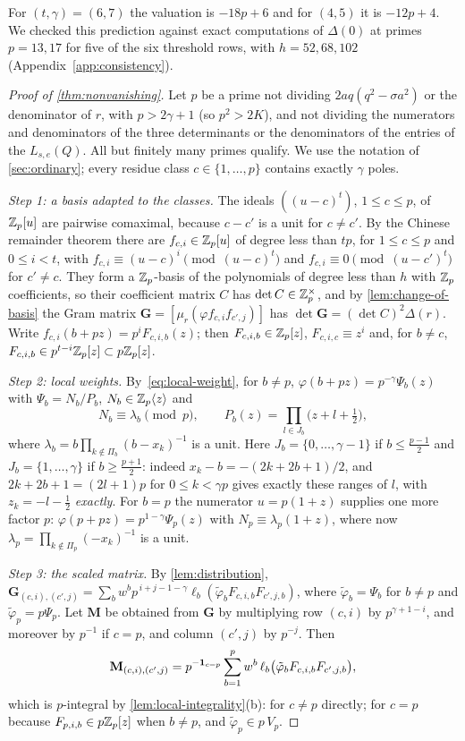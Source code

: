 For $(t,\gamma)=(6,7)$ the valuation is $-18p+6$ and for $(4,5)$ it is $-12p+4$. We checked this
prediction against exact computations of $\Delta(0)$ at primes $p=13,17$ for five of the six
threshold rows, with $h=52,68,102$ (Appendix~\ref{app:consistency}).

\begin{proof}[Proof of \cref{thm:nonvanishing}]
Let $p$ be a prime not dividing $2aq(q^2-\sigma a^2)$ or the denominator of $r$, with $p>2\gamma+1$
(so $p^2>2K$), and not dividing the numerators and denominators of the three determinants or the
denominators of the entries of the $L_{s,e}(Q)$. All but finitely many primes qualify. We use the
notation of \cref{sec:ordinary}; every residue class $c\in\{1,\dots,p\}$ contains exactly
$\gamma$ poles.

\emph{Step 1: a basis adapted to the classes.} The ideals $((u-c)^t)$, $1\le c\le p$, of
$\mathbb{Z}_p[u]$ are pairwise comaximal, because $c-c'$ is a unit for $c\ne c'$. By the Chinese remainder
theorem there are $f_{c,i}\in\mathbb{Z}_p[u]$ of degree less than $tp$, for $1\le c\le p$ and $0\le
i<t$, with $f_{c,i}\equiv(u-c)^i\pmod{(u-c)^t}$ and $f_{c,i}\equiv0\pmod{(u-c')^t}$ for $c'\ne c$.
They form a $\mathbb{Z}_p$-basis of the polynomials of degree less than $h$ with $\mathbb{Z}_p$ coefficients, so
their coefficient matrix $C$ has $\det C\in\mathbb{Z}_p^\times$, and by \cref{lem:change-of-basis} the
Gram matrix $\mathbf G=[\mu_r(\varphi f_{c,i}f_{c',j})]$ has $\det\mathbf G=(\det C)^2\Delta(r)$.
Write $f_{c,i}(b+pz)=p^iF_{c,i,b}(z)$; then $F_{c,i,b}\in\mathbb{Z}_p[z]$, $F_{c,i,c}\equiv z^i$ and,
for $b\ne c$, $F_{c,i,b}\in p^{t-i}\mathbb{Z}_p[z]\subset p\mathbb{Z}_p[z]$.

\emph{Step 2: local weights.} By~\eqref{eq:local-weight}, for $b\ne p$,
$\varphi(b+pz)=p^{-\gamma}\Psi_b(z)$ with $\Psi_b=N_b/P_b$, $N_b\in\mathbb{Z}_p\langle z\rangle$ and
\[
  N_b\equiv\lambda_b\pmod p,\qquad P_b(z)=\prod_{l\in J_b}\bigl(z+l+\tfrac12\bigr),
\]
where $\lambda_b=b\prod_{k\notin\Pi_b}(b-x_k)^{-1}$ is a unit. Here $J_b=\{0,\dots,\gamma-1\}$ if
$b\le\frac{p-1}2$ and $J_b=\{1,\dots,\gamma\}$ if $b\ge\frac{p+1}2$: indeed
$x_k-b=-(2k+2b+1)/2$, and $2k+2b+1=(2l+1)p$ for $0\le k<\gamma p$ gives exactly these ranges of
$l$, with $z_k=-l-\frac12$ \emph{exactly}. For $b=p$ the numerator $u=p(1+z)$ supplies one more
factor $p$: $\varphi(p+pz)=p^{1-\gamma}\Psi_p(z)$ with $N_p\equiv\lambda_p(1+z)$, where now $\lambda_p=\prod_{k\notin\Pi_p}(-x_k)^{-1}$ is a unit.

\emph{Step 3: the scaled matrix.} By \cref{lem:distribution},
$\mathbf G_{(c,i),(c',j)}=\sum_bw^bp^{\,i+j-1-\gamma}\ell_b(\tilde\varphi_bF_{c,i,b}F_{c',j,b})$, where
$\tilde\varphi_b=\Psi_b$ for $b\ne p$ and $\tilde\varphi_p=p\Psi_p$. Let $\mathbf M$ be obtained from
$\mathbf G$ by multiplying row $(c,i)$ by $p^{\gamma+1-i}$, and moreover by $p^{-1}$ if $c=p$, and
column $(c',j)$ by $p^{-j}$. Then
\[
  \mathbf M_{(c,i),(c',j)}=p^{-\mathbf{1}_{c=p}}\sum_{b=1}^pw^b\,\ell_b\bigl(\tilde\varphi_bF_{c,i,b}F_{c',j,b}\bigr),
\]
which is $p$-integral by \cref{lem:local-integrality}(b): for $c\ne p$ directly; for $c=p$ because
$F_{p,i,b}\in p\mathbb{Z}_p[z]$ when $b\ne p$, and $\tilde\varphi_p\in p\,V_p$.


\end{proof}
